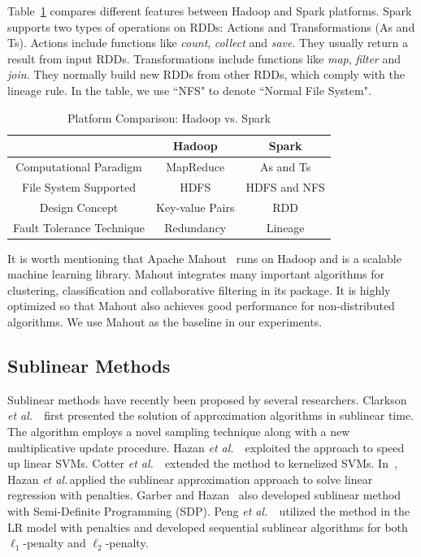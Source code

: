 \documentclass[10pt, conference, compsocconf]{IEEEtran}
\def\etal{{\em et al.\/}\,}
\begin{document}
Table~\ref{tab:systemcmp} compares different features between Hadoop and Spark platforms.
Spark supports two types of operations on RDDs: Actions and Transformations (As and Ts).
Actions include functions like \textit{count}, \textit{collect} and \textit{save}. They usually return a result from input RDDs.
Transformations include functions like \textit{map}, \textit{filter} and \textit{join}. They normally build new RDDs from other RDDs, which comply with the lineage rule.
In the table, we use ``NFS" to denote ``Normal File System".\

\begin{table}[h]
\centering
\caption{Platform Comparison: Hadoop vs. Spark}\label{tab:systemcmp}\vspace{-0.3cm}
\begin{tabular}{|c|c|c|}
\hline
           & Hadoop & Spark \\
\hline
Computational Paradigm  & MapReduce & As and Ts \\
\hline
File System Supported & HDFS & HDFS and NFS \\
\hline
Design Concept  & Key-value Pairs & RDD \\
\hline
Fault Tolerance Technique & Redundancy & Lineage \\
\hline
\end{tabular}
\end{table}

It is worth mentioning that Apache Mahout~\cite{mahoutscalable} runs on Hadoop and is a scalable machine learning library. Mahout integrates many important algorithms for clustering, classification and collaborative filtering in its package. It is highly optimized so that Mahout also achieves good performance for non-distributed algorithms. We use Mahout as the baseline in our experiments.

\subsection{Sublinear Methods}

Sublinear methods have recently been proposed by several researchers.
Clarkson \etal~\cite{clarkson2010sublinear} first presented the solution of approximation algorithms in sublinear time.
The algorithm employs a novel sampling technique along with a new multiplicative update procedure.
Hazan \etal~\cite{hazanbeating} exploited the approach to speed up linear SVMs.
Cotter \etal~\cite{cotter2012kernelized} extended the method to kernelized SVMs.
In~\cite{hazan2011optimal}, Hazan \etal applied the sublinear approximation approach to solve linear regression with penalties.
Garber and Hazan~\cite{garberapproximating} also developed sublinear method with Semi-Definite Programming (SDP).
Peng \etal~\cite{peng2012sublinear} utilized the method in the LR model with penalties and developed sequential sublinear algorithms for both $\ell_1$-penalty and $\ell_2$-penalty.
\end{document}
